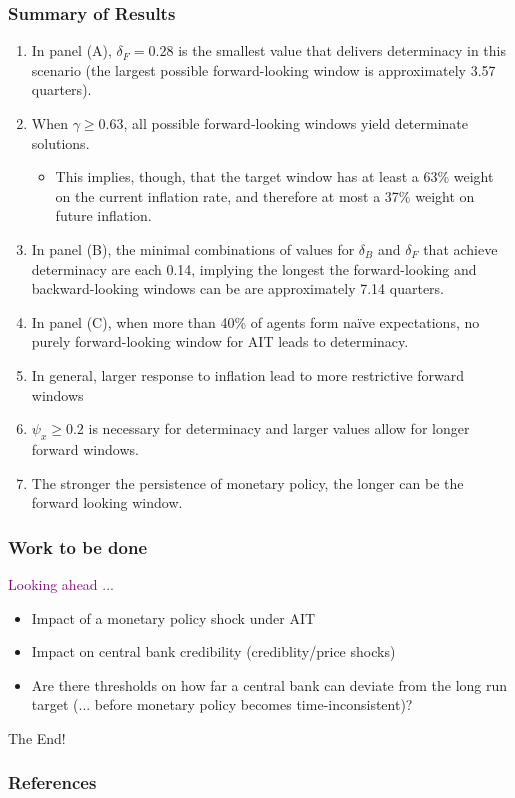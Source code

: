 \documentclass{beamer}
\begin{document}
\begin{frame}[allowframebreaks]
	\frametitle{Summary of Results}
	\begin{enumerate}
		\setlength{\itemsep}{1em}
		\item In panel (A), $\delta_F =0.28$ is the smallest value that delivers determinacy in this scenario (the largest possible forward-looking window is approximately 3.57 quarters).
		\item When $\gamma \geq 0.63$, all possible forward-looking windows yield determinate solutions. 
		\begin{itemize}
			\item This implies, though, that the target window has at least a 63\% weight on the current inflation rate, and therefore at most a 37\% weight on future inflation.
		\end{itemize}
		\item In panel (B), the minimal combinations of values for $\delta_B$ and $\delta_F$ that achieve determinacy are each 0.14, implying the longest the forward-looking and backward-looking windows can be are approximately 7.14 quarters.
		\item In panel (C), when more than 40\% of agents form na\"ive expectations, no purely forward-looking window for AIT leads to determinacy.
		\item In general, larger response to inflation lead to more restrictive forward windows
		\item $\psi_x \geq 0.2$ is necessary for determinacy and larger values allow for longer forward windows.  
		\item The stronger the persistence of monetary policy, the longer can be the forward looking window.
	\end{enumerate}
\end{frame}

\begin{frame}
	\frametitle{Work to be done}
	\textcolor{purple}{Looking ahead ...}
	\begin{itemize}
		\setlength{\itemsep}{1em}
		\item Impact of a monetary policy shock under AIT
		\item Impact on central bank credibility (crediblity/price shocks)
		\item Are there thresholds on how far a central bank can deviate from the long run target (... before monetary policy becomes time-inconsistent)?
	\end{itemize}
\end{frame}

\begin{frame}
	\centering
	The End!
\end{frame}

\appendix
\begin{frame}[allowframebreaks]
	\frametitle{References}
	
	
\end{frame}
\end{document}
